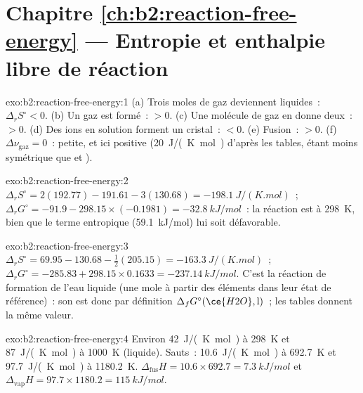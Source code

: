 \section*{Chapitre \ref{ch:b2:reaction-free-energy} --- Entropie et enthalpie libre de réaction}

\begin{solution}{exo:b2:reaction-free-energy:1}
(a) Trois moles de gaz deviennent liquides~: $\Delta_r S^\circ < 0$. (b) Un gaz est
formé~: $> 0$. (c) Une molécule de gaz en donne deux~: $> 0$. (d) Des ions en solution
forment un cristal~: $< 0$. (e) Fusion~: $> 0$. (f) $\Delta\nu_{\text{gaz}} = 0$~:
petite, et ici positive (\qty{+20}{J/(K.mol)} d'après les tables, 
étant moins symétrique que  et ).
\end{solution}

\begin{solution}{exo:b2:reaction-free-energy:2}
$\Delta_r S^\circ = 2(192.77) - 191.61 - 3(130.68) = \qty{-198.1}{J/(K.mol)}$~;
$\Delta_r G^\circ = -91.9 - 298.15 \times (-0.1981) = \qty{-32.8}{kJ/mol}$~:
la réaction est  à \qty{298}{K}, bien que le terme entropique (\qty{+59.1}{kJ/mol})
lui soit défavorable.
\end{solution}

\begin{solution}{exo:b2:reaction-free-energy:3}
$\Delta_r S^\circ = 69.95 - 130.68 - \tfrac12(205.15) = \qty{-163.3}{J/(K.mol)}$~;
$\Delta_r G^\circ = -285.83 + 298.15 \times 0.1633 = \qty{-237.14}{kJ/mol}$.
C'est la réaction de formation de l'eau liquide (une mole à partir des éléments dans
leur état de référence)~: son  est donc par
définition $\Delta_f G^\circ(\ce{H2O}, \text{l})$~; les tables donnent la même
valeur.
\end{solution}

\begin{solution}{exo:b2:reaction-free-energy:4}
Environ \qty{42}{J/(K.mol)} à \qty{298}{K} et \qty{87}{J/(K.mol)} à
\qty{1000}{K} (liquide). Sauts~: \qty{10.6}{J/(K.mol)} à \qty{692.7}{K} et
\qty{97.7}{J/(K.mol)} à \qty{1180.2}{K}. $\Delta_{\text{fus}}H = 10.6 \times
692.7 = \qty{7.3}{kJ/mol}$ et $\Delta_{\text{vap}}H = 97.7 \times 1180.2 =
\qty{115}{kJ/mol}$.
\end{solution}

